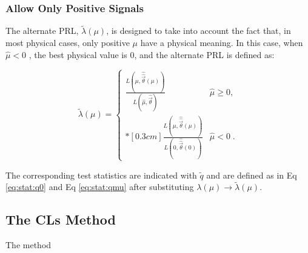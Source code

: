  
\subsubsection*{Allow Only Positive Signals}

The alternate PRL, $\tilde{\lambda}({\mu})$, is designed to take into account the fact that, in most physical cases, only positive $\mu$ have a physical meaning. In this case, when $\hat{\mu} < 0$ , the best physical value is 0, and the alternate PRL is defined as: 

\begin{equation}
\label{eq:stat:lik:alpexcl}
\tilde{\lambda}({\mu}) =
\left\{ \! \! \begin{array}{ll}
               \frac{ L(\mu,
               \hat{\hat{\vec{\theta}}}(\mu)) }
               {L(\hat{\mu}, \hat{\vec{\theta}}) }
                 & \hat{\mu} \ge 0 , \\*[0.3 cm]
                \frac{ L(\mu,
               \hat{\hat{\vec{\theta}}}(\mu)) }
               {L(0, \hat{\hat{\vec{\theta}}}(0)) }
 & \hat{\mu} < 0 \;.
              \end{array}
       \right.
\end{equation}

\noindent The corresponding test statistics are indicated with $\tilde{q}$ and are defined as in Eq \ref{eq:stat:q0} and Eq \ref{eq:stat:qmu} after substituting $\lambda({\mu}) \rightarrow \tilde{\lambda}({\mu})$.

\iffalse
\begin{equation}
\label{eq:stat:q:excl}
\qmu = - 2 \ln \tilde{\lambda}(\mu) =
\left\{ \! \! \begin{array}{ll}
               - 2 \ln \frac{L(\mu, \hat{\hat{\vec{\theta}}}(\mu))}
                {L(0, \hat{\hat{\theta}}(0))}
                & \quad \hat{\mu} < 0  \;, \\*[0.2 cm]
               -2 \ln \frac{L(\mu, \hat{\hat{\vec{\theta}}}(\mu))}
                {L(\hat{\mu}, \hat{\vec{\theta}})}
&  \quad \hat{\mu} \ge 0  \;.
              \end{array}
       \right.
\end{equation}
\fi

\subsection{The CLs Method}

The \cls method \cite{JUNK1999435}

